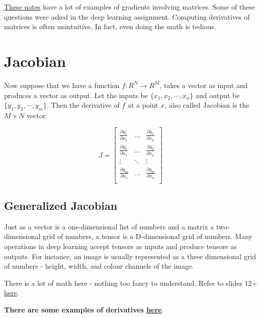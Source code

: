 \href{https://atmos.washington.edu/~dennis/MatrixCalculus.pdf}{These notes} have a lot of examples of gradients involving matrices. Some of these questions were asked in the deep learning assignment. Computing derivatives of matrices is often unintuitive. In fact, even doing the math is tedious.

\section{Jacobian}

Now suppose that we have a function $f: R^N \to R^M$, takes a vector as input and produces a vector as output. Let the inputs be $\{ x_1, x_2, \cdots, x_n  \}$ and output be $\{ y_1, y_2, \cdots, y_m\}$. Then the derivative of $f$ at a point $x$, also called Jacobian is the $M \times N$ vector:

\begin{equation}
    J = \begin{bmatrix}
    \frac{\partial y_1}{\partial x_1} & \hdots & \frac{\partial y_1}{\partial x_n} \\
    \frac{\partial y_2}{\partial x_1} & \hdots & \frac{\partial y_2}{\partial x_n} \\
    \vdots & \ddots & \vdots \\
    \frac{\partial y_m}{\partial x_1} & \hdots & \frac{\partial y_m}{\partial x_n} \\
    \end{bmatrix}
\end{equation}

\subsection{Generalized Jacobian}

Just as a vector is a one-dimensional list of numbers and a matrix a two-dimensional grid of numbers, a tensor is a D-dimensional grid of numbers. Many operations in deep learning accept tensors as inputs and produce tensors as outputs. For instance, an image is usually represented as a three dimensional grid of numbers - height, width, and colour channels of the image. 

There is a lot of math here - nothing too fancy to understand. Refer to slides 12+ \href{https://github.com/RoboticsIIITH/summer-sessions-2020/blob/master/lecture-slides/deep_learning/vector_derivatives.pdf}{here}.

\textbf{There are some examples of derivatives \href{https://github.com/RoboticsIIITH/summer-sessions-2020/blob/master/lecture-slides/deep_learning/vector_derivatives.pdf}{here}}.

